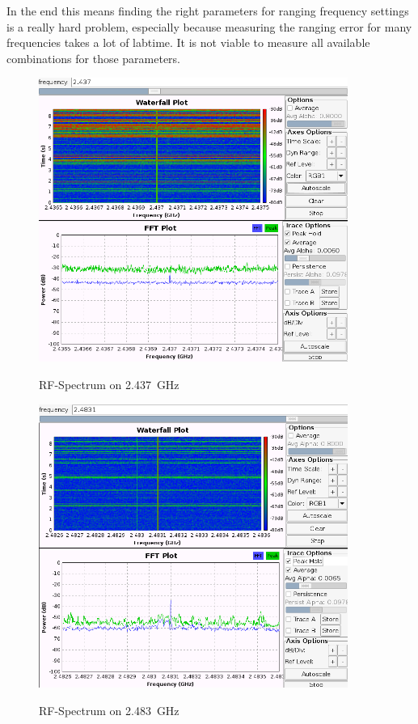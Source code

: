 In the end this means finding the right parameters for ranging frequency settings is a really hard problem, especially because measuring the ranging error for many frequencies takes a lot of labtime.
It is not viable to measure all available combinations for those parameters.


\begin{figure}[H]
	\centering
\includegraphics[width=0.9\textwidth]{figures/ch6.png}
\label{spectrum2437}
\caption{RF-Spectrum on \SI{2.437}{\giga\hertz}}
\end{figure}

\begin{figure}[H]
	\centering
\includegraphics[width=0.9\textwidth]{figures/ranging_0.png}
\label{spectrum2483}
\caption{RF-Spectrum on \SI{2.483}{\giga\hertz}}
\end{figure}



